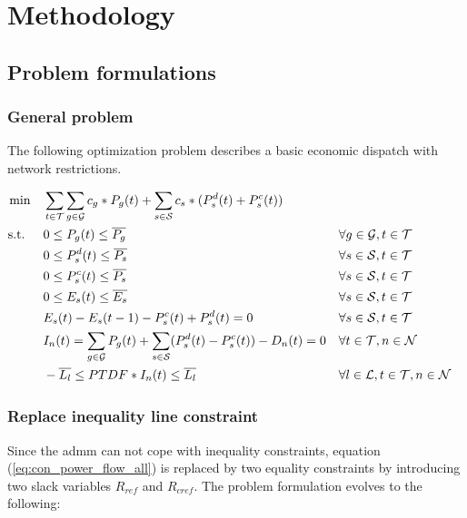 \section{Methodology}


\subsection{Problem formulations}

\subsubsection{General problem}
\label{sec:general_formulation}

The following optimization problem describes a basic economic dispatch with network restrictions.

\begin{subequations}
	\begin{align}
		 \min \quad & \sum_{t\in\mathcal{T}}\sum_{g\in\mathcal{G}}c_g*P_g(t) + \sum_{s\in\mathcal{S}}c_s*(P_s^d(t)+P_s^c(t))\\
		 \text{s.t. } \quad & 0 \leq P_g(t) \leq \overline{P_g} && \forall g \in \mathcal{G}, t \in \mathcal{T}\\
		 & 0 \leq P_s^d(t) \leq \overline{P_s} && \forall s \in \mathcal{S}, t \in \mathcal{T}\\
		 & 0 \leq P_s^c(t) \leq \overline{P_s} && \forall s \in \mathcal{S}, t \in \mathcal{T}\\
		 & 0 \leq E_s(t) \leq \overline{E_s} && \forall s \in \mathcal{S}, t \in \mathcal{T}\\
		 & E_s(t) - E_s(t-1) - P_s^c(t) + P_s^d(t) = 0 && \forall s \in \mathcal{S}, t \in \mathcal{T}\\
		 & I_n(t) = \sum_{g\in\mathcal{G}}P_g(t) + \sum_{s\in\mathcal{S}}(P_s^d(t)-P_s^c(t))-D_n(t) = 0 && \forall t \in \mathcal{T}, n \in \mathcal{N}\\
		 & -\overline{L_l} \leq PTDF * I_n(t) \leq \overline{L_l} && \forall l \in \mathcal{L}, t \in \mathcal{T}, n \in \mathcal{N} \label{eq:con_power_flow_all}
	\end{align}
\end{subequations}

\subsubsection{Replace inequality line constraint}

Since the \gls{admm} can not cope with inequality constraints, equation (\ref{eq:con_power_flow_all}) is replaced by two equality constraints by introducing two slack variables $R_{ref}$ and $R_{cref}$. The problem formulation evolves to the following:

